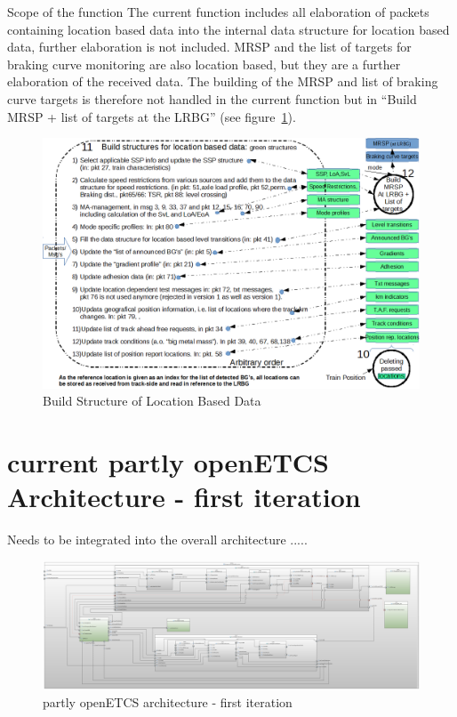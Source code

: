 \documentclass{template/openetcs_report}
\begin{document}
Scope of the function
The current function includes all elaboration of packets containing location based data into the internal data structure for location based data, further elaboration is not included.
MRSP and the list of targets for braking curve monitoring are also location based, but they are a further elaboration of the received data. The building of the MRSP and list of braking curve targets is therefore not handled in the current function but in “Build MRSP + list of targets at the LRBG” (see figure~\ref{fig:lbd}).


\begin{figure}[hbtp]
\centering
\includegraphics[angle=0, scale=0.55] {images/build_structure_for_location_based_data.png}
\caption{Build Structure of Location Based Data}
\label{fig:lbd}
\end{figure}

 
 \newpage
 \chapter{current partly openETCS Architecture - first iteration}
 Needs to be integrated into the overall architecture .....
  \begin{figure}[hbtp]
\centering
\includegraphics [angle=90, scale=0.2]{images/Current_partly_openETCS_architecture}
\caption{partly openETCS architecture - first iteration}
\end{figure}
 
\end{document}
